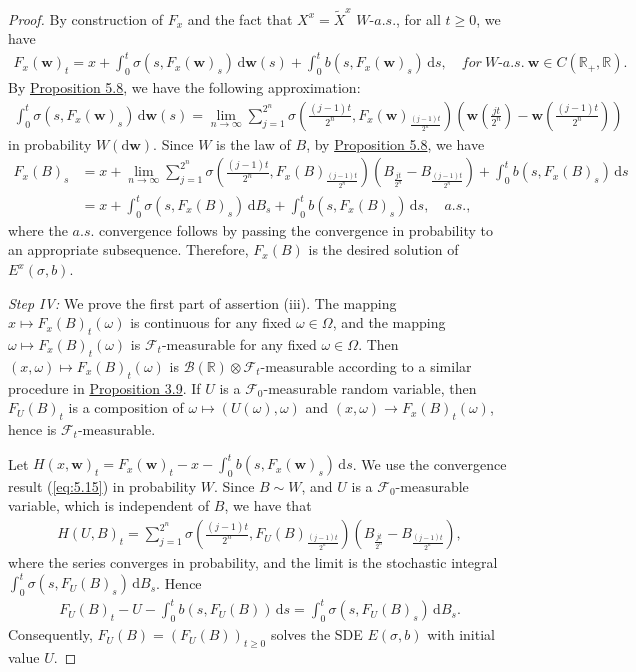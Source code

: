 \documentclass{article}
\numberwithin{equation}{section}
\newcommand{\bfw}{\mathbf{w}}
\renewcommand{\d}{\mathrm{d}}
\theoremstyle{plain}
\theoremstyle{definition}
\begin{document}
\begin{proof}
By construction of $F_x$ and the fact that $X^x=\widetilde{X}^x$ $W$-$a.s.$, for all $t\geq 0$, we have
\begin{align*}
	F_x(\bfw)_t = x+\int_0^t\sigma(s,F_x(\bfw)_s)\,\d\bfw(s) + \int_0^t b(s,F_x(\bfw)_s)\,\d s,\quad for\ W\textit{-}a.s.\ \bfw\in C(\mathbb{R}_+,\mathbb{R}).
\end{align*}
By \hyperref[prop:5.8]{Proposition 5.8}, we have the following approximation:
\begin{align*}
	\int_0^t\sigma(s,F_x(\bfw)_s)\,\d\bfw(s) = \lim_{n\to\infty}\sum_{j=1}^{2^n}\sigma\left(\frac{(j-1)t}{2^n},F_x\left(\bfw\right)_{\frac{(j-1)t}{2^n}}\right)\left(\bfw\left(\frac{jt}{2^n}\right)-\bfw\left(\frac{(j-1)t}{2^n}\right)\right)\tag{5.15}\label{eq:5.15}
\end{align*}
in probability $W(\d\bfw)$. Since $W$ is the law of $B$, by \hyperref[prop:5.8]{Proposition 5.8}, we have
\begin{align*}
	F_x(B)_s &= x + \lim_{n\to\infty}\sum_{j=1}^{2^n}\sigma\left(\frac{(j-1)t}{2^n},F_x(B)_{\frac{(j-1)t}{2^n}}\right)\left(B_{\frac{jt}{2^n}}-B_{\frac{(j-1)t}{2^n}}\right) +  \int_0^t b(s,F_x(B)_s)\,\d s\\
	&= x + \int_0^t\sigma(s,F_x(B)_s)\,\d B_s + \int_0^t b(s,F_x(B)_s)\,\d s,\quad a.s.,
\end{align*}
where the $a.s.$ convergence follows by passing the convergence in probability to an appropriate subsequence. Therefore, $F_x(B)$ is the desired solution of $E^x(\sigma,b)$.\vspace{0.1cm}

\textit{Step IV:} We prove the first part of assertion (iii). The mapping $x\mapsto F_x(B)_t(\omega)$ is continuous for any fixed $\omega\in\Omega$, and the mapping $\omega\mapsto F_x(B)_t(\omega)$ is $\mathscr{F}_t$-measurable for any fixed $\omega\in\Omega$. Then $(x,\omega)\mapsto F_x(B)_t(\omega)$ is $\mathscr{B}(\mathbb{R})\otimes\mathscr{F}_t$-measurable according to a similar procedure in \hyperref[prop:3.9]{Proposition 3.9}. If $U$ is a $\mathscr{F}_0$-measurable random variable, then $F_U(B)_t$ is a composition of $\omega\mapsto(U(\omega),\omega)$ and $(x,\omega)\to F_x(B)_t(\omega)$, hence is $\mathscr{F}_t$-measurable.

Let $H(x,\bfw)_t=F_x(\bfw)_t-x-\int_0^t b(s,F_x(\bfw)_s)\,\d s$. We use the convergence result (\ref{eq:5.15}) in probability $W$. Since $B\sim W$, and $U$ is a $\mathscr{F}_0$-measurable variable, which is independent of $B$, we have that
\begin{align*}
	H(U,B)_t=\sum_{j=1}^{2^n}\sigma\left(\frac{(j-1)t}{2^n},F_U(B)_{\frac{(j-1)t}{2^n}}\right)\left(B_{\frac{jt}{2^n}}-B_{\frac{(j-1)t}{2^n}}\right),
\end{align*}
where the series converges in probability, and the limit is the stochastic integral $\int_0^t\sigma(s,F_U(B)_s)\,\d B_s$. Hence
\begin{align*}
	F_U(B)_t - U - \int_0^t b(s,F_U(B))\,\d s = \int_0^t\sigma(s,F_U(B)_s)\,\d B_s.
\end{align*}
Consequently, $F_U(B)=(F_U(B))_{t\geq 0}$ solves the SDE $E(\sigma,b)$ with initial value $U$.
\end{proof}
\end{document}
